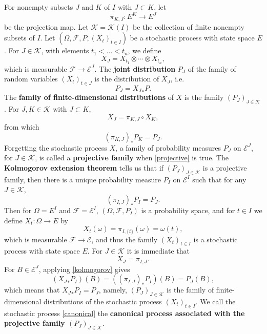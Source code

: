 \documentclass{article}
\theoremstyle{definition}
\theoremstyle{definition}
\begin{document}
For nonempty subsets $J$ and $K$ of $I$ with $J \subset K$, let
\[
\pi_{K,J}:E^K \to E^J
\]
be the projection map. 
Let $\mathscr{K}=\mathscr{K}(I)$ be the collection of finite nonempty subsets of $I$.
Let $(\Omega,\mathscr{F},P,(X_t)_{t \in I})$ be
a stochastic process 
with state space $E$.
For $J \in \mathscr{K}$, with elements $t_1<\ldots<t_n$, we define
\[
X_J = X_{t_1} \otimes \cdots \otimes X_{t_n},
\]
which is measurable $\mathscr{F} \to \mathscr{E}^J$. 
The \textbf{joint distribution} $P_J$ of the family of random variables
$(X_t)_{t \in J}$ is the distribution of $X_J$, i.e.
\[
P_J={X_J}_*P.
\]
The \textbf{family of finite-dimensional distributions} of $X$ is the family $(P_J)_{J \in \mathscr{K}}$. 
For $J,K \in \mathscr{K}$ with $J \subset K$,
\[
X_J = \pi_{K,J} \circ X_K,
\]
from which
\begin{equation}
(\pi_{K,J})_* P_K = P_J.
\label{projective}
\end{equation}
Forgetting the stochastic process $X$, a family of probability measures $P_J$ on $\mathscr{E}^J$, for $J \in \mathscr{K}$,
is called a \textbf{projective family} when \eqref{projective} is true. The \textbf{Kolmogorov extension theorem}
tells us that if $(P_J)_{J \in \mathscr{K}}$ is a projective family, then there is a unique probability measure $P_I$
on $\mathscr{E}^I$ such that for any $J \in \mathscr{K}$,
\begin{equation}
(\pi_{I,J})_*P_I = P_J.
\label{kolmogorov}
\end{equation}
Then for $\Omega=E^I$ and $\mathscr{F}=\mathscr{E}^I$, $(\Omega,\mathscr{F},P_I)$ is a probability space, and for
$t \in I$ we define $X_t:\Omega \to E$ by
\begin{equation}
X_t(\omega) =\pi_{I,\{t\}}(\omega)= \omega(t),
\label{canonical}
\end{equation}
which is measurable $\mathscr{F} \to \mathscr{E}$, and thus the family $(X_t)_{t \in I}$ is a stochastic process with state space
$E$. For $J \in \mathscr{K}$ it is immediate that
\[
X_J = \pi_{I,J}.
\]
For $B \in \mathscr{E}^J$, applying \eqref{kolmogorov} gives
\[
({X_J}_*P_I)(B) = ((\pi_{I,J})_*P_I)(B) =P_J(B), 
\]
which means that ${X_J}_*P_I=P_J$, namely, $(P_J)_{J \in \mathscr{K}}$
is the family of finite-dimensional distributions of the stochastic process $(X_t)_{t \in I}$.
We call the stochastic process \eqref{canonical} the \textbf{canonical process associated with the projective family
$(P_J)_{J \in \mathscr{K}}$}.
\end{document}
